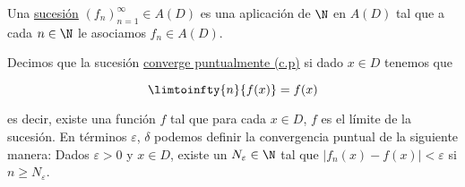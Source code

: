 \begin{defn}
    Una \ul{sucesión} $(f_n)_{n=1}^{\infty} \in A(D)$ es una aplicación de $\N$ en $A(D)$ tal que a cada $n \in \N$ le asociamos $f_n \in A(D)$.
    
    Decimos que la sucesión \ul{converge puntualmente (c.p)} si dado $x \in D$ tenemos que
    
    \[
    \limtoinfty{n}{f(x)} = f(x)
    \]
    
    \noindent es decir, existe una función $f$ tal que para cada $x \in D$, $f$ es el límite de la sucesión. En términos $\varepsilon$, $\delta$ podemos definir la convergencia puntual de la siguiente manera: Dados $\varepsilon > 0$ y $x \in D$, existe un $N_{\varepsilon} \in \N$ tal que $|f_n(x) - f(x)| < \varepsilon$ si $n \geq N_{\varepsilon}$.
\end{defn}

